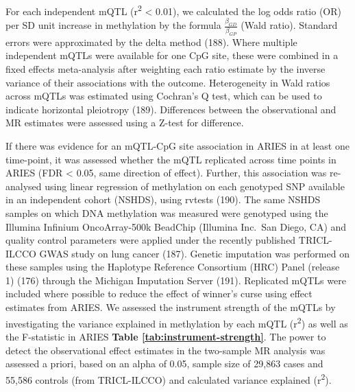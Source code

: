 \documentclass[11pt,oneside]{bristolthesis}
\begin{document}
For each independent mQTL (r\textsuperscript{2} \textless{} 0.01), we calculated the log odds ratio (OR) per SD unit increase in methylation by the formula \(\frac{\beta_{GD}} {\beta_{GP}}\) (Wald ratio). Standard errors were approximated by the delta method (188). Where multiple independent mQTLs were available for one CpG site, these were combined in a fixed effects meta-analysis after weighting each ratio estimate by the inverse variance of their associations with the outcome. Heterogeneity in Wald ratios across mQTLs was estimated using Cochran's Q test, which can be used to indicate horizontal pleiotropy (189). Differences between the observational and MR estimates were assessed using a Z-test for difference.

If there was evidence for an mQTL-CpG site association in ARIES in at least one time-point, it was assessed whether the mQTL replicated across time points in ARIES (FDR \textless{} 0.05, same direction of effect). Further, this association was re-analysed using linear regression of methylation on each genotyped SNP available in an independent cohort (NSHDS), using rvtests (190). The same NSHDS samples on which DNA methylation was measured were genotyped using the Illumina Infinium OncoArray-500k BeadChip (Illumina Inc.~San Diego, CA) and quality control parameters were applied under the recently published TRICL-ILCCO GWAS study on lung cancer (187). Genetic imputation was performed on these samples using the Haplotype Reference Consortium (HRC) Panel (release 1) (176) through the Michigan Imputation Server (191). Replicated mQTLs were included where possible to reduce the effect of winner's curse using effect estimates from ARIES. We assessed the instrument strength of the mQTLs by investigating the variance explained in methylation by each mQTL (r\textsuperscript{2}) as well as the F-statistic in ARIES \textbf{Table \ref{tab:instrument-strength}}. The power to detect the observational effect estimates in the two-sample MR analysis was assessed a priori, based on an alpha of 0.05, sample size of 29,863 cases and 55,586 controls (from TRICL-ILCCO) and calculated variance explained (r\textsuperscript{2}).
\end{document}
